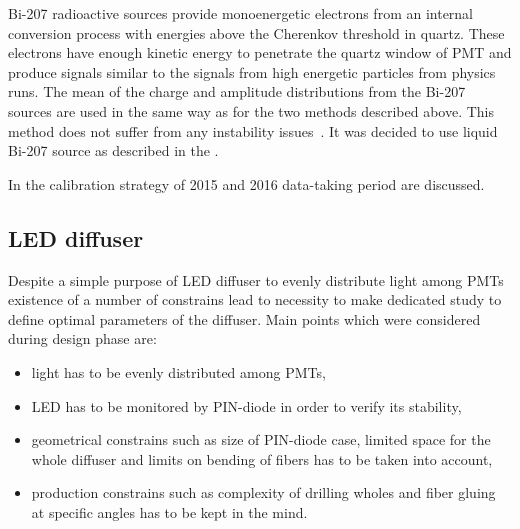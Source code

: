 Bi-207 radioactive sources provide monoenergetic electrons from an internal conversion process with energies 
above the Cherenkov threshold in quartz. These electrons
have enough kinetic energy to penetrate the quartz window of PMT and produce signals similar to the signals 
from high energetic particles from physics runs. The mean of the charge and amplitude 
distributions from the Bi-207 sources are used in the same way as for the two methods described above. 
This method does not suffer from any instability issues~\cite{Alberghi:2016tad}.
It was decided to use liquid Bi-207 source as described in the .

In the  calibration strategy of 2015 and 2016 data-taking period are discussed.

\subsection{LED diffuser}
\label{subsec:LEDDiffuser}





Despite a simple purpose of LED diffuser to evenly distribute light among PMTs existence of a number of constrains lead to necessity to make dedicated study 
to define optimal parameters of the diffuser. Main points which were considered during design phase are:
\begin{itemize}
 \item light has to be evenly distributed among PMTs,
 \item LED has to be monitored by PIN-diode in order to verify its stability,
 \item geometrical constrains such as size of PIN-diode case, limited space for the whole diffuser and limits on bending of fibers has to be taken into account,
 \item production constrains such as complexity of drilling wholes and fiber gluing at specific angles has to be kept in the mind.
\end{itemize}

